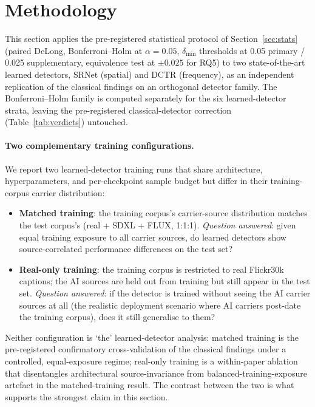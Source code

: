 \documentclass[10pt,twocolumn,a4paper]{article}
\DeclareRobustCommand{\by}[1]{\textnormal{\normalfont\footnotesize\space--- #1}}
\begin{document}
\section[Learned-Detector Cross-Validation\by{\textbf{Writer:} David Wicker \textbf{Reviewer:} Abdul \textbf{Contributor:}  Daria}]{Methodology}

\label{sec:learnedxval}


This section applies the pre-registered statistical protocol of Section~\ref{sec:stats} (paired DeLong, Bonferroni--Holm at $\alpha\!=\!0.05$, $\delta_\text{min}$ thresholds at 0.05 primary / 0.025 supplementary, equivalence test at $\pm 0.025$ for RQ5) to two state-of-the-art learned detectors, SRNet (spatial) and DCTR (frequency), as an independent replication of the classical findings on an orthogonal detector family. The Bonferroni--Holm family is computed separately for the six learned-detector strata, leaving the pre-registered classical-detector correction (Table~\ref{tab:verdicts}) untouched.

\paragraph{Two complementary training configurations.} We report two learned-detector training runs that share architecture, hyperparameters, and per-checkpoint sample budget but differ in their training-corpus carrier distribution:

\begin{itemize}
\item \textbf{Matched training}: the training corpus's carrier-source distribution matches the test corpus's (real + SDXL + FLUX, 1:1:1). \emph{Question answered}: given equal training exposure to all carrier sources, do learned detectors show source-correlated performance differences on the test set?
\item \textbf{Real-only training}: the training corpus is restricted to real Flickr30k captions; the AI sources are held out from training but still appear in the test set. \emph{Question answered}: if the detector is trained without seeing the AI carrier sources at all (the realistic deployment scenario where AI carriers post-date the training corpus), does it still generalise to them?
\end{itemize}

\noindent Neither configuration is `the' learned-detector analysis: matched training is the pre-registered confirmatory cross-validation of the classical findings under a controlled, equal-exposure regime; real-only training is a within-paper ablation that disentangles architectural source-invariance from balanced-training-exposure artefact in the matched-training result. The contrast between the two is what supports the strongest claim in this section.
\end{document}
